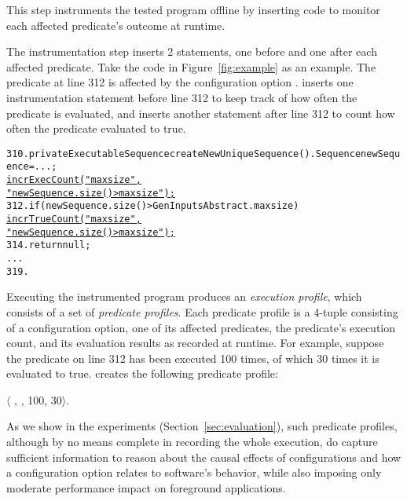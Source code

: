 This step instruments the tested program offline
by inserting code to monitor each affected predicate's outcome
at runtime.

The instrumentation step inserts 2 statements, one
before and one after each affected predicate. Take
the code in Figure~\ref{fig:example} as an example.
The predicate at line 312 is affected by
the configuration option . \ourtool inserts
one instrumentation statement before line 312 to
keep track of how often the predicate is evaluated, and
inserts another statement after line 312 to count how often
the predicate evaluated to true.


\begin{CodeOut}
\begin{alltt}
310. private ExecutableSequence createNewUniqueSequence() .   Sequence newSequence = ...; 
       \underline{incrExecCount("maxsize",}
                     \underline{"newSequence.size() > maxsize");}
312.   if (newSequence.size() > GenInputsAbstract.maxsize) \ttlcb
         \underline{incrTrueCount("maxsize",}
                       \underline{"newSequence.size() > maxsize");}
314.     return null;
      ...
319. \ttrcb
\end{alltt}
\end{CodeOut}


Executing the instrumented program produces an \textit{execution profile}, which
consists of a set of \textit{predicate profiles}.
Each predicate profile is a 4-tuple consisting of a configuration option,
one of its affected predicates, the predicate's execution count, and its evaluation results as recorded at runtime. For example,
suppose the predicate on line 312 has been executed 100 times, of which
30 times it is evaluated to true. \ourtool creates the following predicate
profile:

\noindent $\langle$ , , 100, 30$\rangle$.

\vspace{1mm}


As we show in the experiments (Section~\ref{sec:evaluation}),
such predicate profiles, although by no means complete in
recording the whole execution, do capture
sufficient information to reason about the causal effects of configurations
and how a configuration option relates to software's behavior, while
also imposing only moderate performance impact
on foreground applications.





